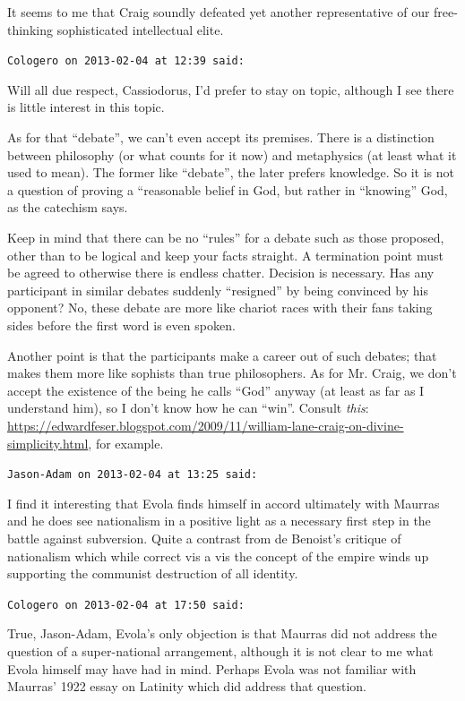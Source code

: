 \begin{footnotesize}
\begin{sffamily}
It seems to me that Craig soundly defeated yet another representative of our free-thinking sophisticated intellectual elite.

\hfill

\texttt{Cologero on 2013-02-04 at 12:39 said:}

Will all due respect, Cassiodorus, I'd prefer to stay on topic, although I see there is little interest in this topic.

As for that ``debate'', we can't even accept its premises. There is a distinction between philosophy (or what counts for it now) and metaphysics (at least what it used to mean). The former like ``debate'', the later prefers knowledge. So it is not a question of proving a ``reasonable belief in God, but rather in ``knowing'' God, as the catechism says.

Keep in mind that there can be no ``rules'' for a debate such as those proposed, other than to be logical and keep your facts straight. A termination point must be agreed to otherwise there is endless chatter. Decision is necessary. Has any participant in similar debates suddenly ``resigned'' by being convinced by his opponent? No, these debate are more like chariot races with their fans taking sides before the first word is even spoken.

Another point is that the participants make a career out of such debates; that makes them more like sophists than true philosophers. As for Mr. Craig, we don't accept the existence of the being he calls ``God'' anyway (at least as far as I understand him), so I don't know how he can ``win''. Consult \textit{this}: \url{https://edwardfeser.blogspot.com/2009/11/william-lane-craig-on-divine-simplicity.html}, for example.

\hfill

\texttt{Jason-Adam on 2013-02-04 at 13:25 said:}

I find it interesting that Evola finds himself in accord ultimately with Maurras and he does see nationalism in a positive light as a necessary first step in the battle against subversion. Quite a contrast from de Benoist's critique of nationalism which while correct vis a vis the concept of the empire winds up supporting the communist destruction of all identity.

\hfill

\texttt{Cologero on 2013-02-04 at 17:50 said:}

True, Jason-Adam, Evola's only objection is that Maurras did not address the question of a super-national arrangement, although it is not clear to me what Evola himself may have had in mind. Perhaps Evola was not familiar with Maurras' 1922 essay on Latinity which did address that question.


\end{sffamily}
\end{footnotesize}
